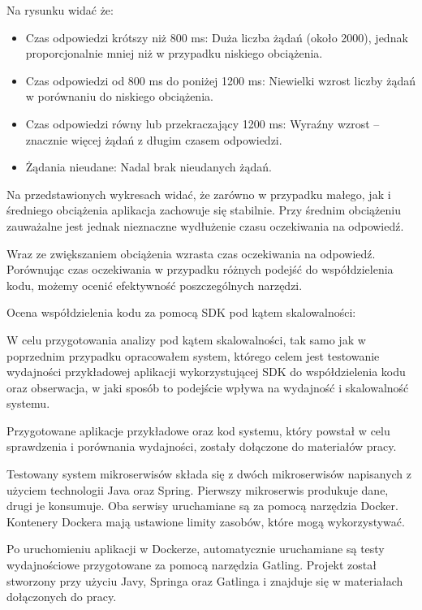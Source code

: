 \documentclass[runningheads,12pt]{llncs}
\begin{document}
Na rysunku widać że:

\begin{itemize}
    \item Czas odpowiedzi krótszy niż 800 ms: Duża liczba żądań (około 2000), jednak proporcjonalnie mniej niż w przypadku niskiego obciążenia.
    \item Czas odpowiedzi od 800 ms do poniżej 1200 ms: Niewielki wzrost liczby żądań w porównaniu do niskiego obciążenia.
    \item Czas odpowiedzi równy lub przekraczający 1200 ms: Wyraźny wzrost – znacznie więcej żądań z długim czasem odpowiedzi.
    \item Żądania nieudane: Nadal brak nieudanych żądań.
  \end{itemize}

Na przedstawionych wykresach widać, że zarówno w przypadku małego, jak i średniego obciążenia aplikacja zachowuje się stabilnie. Przy średnim obciążeniu zauważalne jest jednak nieznaczne wydłużenie czasu oczekiwania na odpowiedź.

\newpage

Wraz ze zwiększaniem obciążenia wzrasta czas oczekiwania na odpowiedź. Porównując czas oczekiwania w przypadku różnych podejść do współdzielenia kodu, możemy ocenić efektywność poszczególnych narzędzi.

Ocena współdzielenia kodu za pomocą SDK pod kątem skalowalności:

W celu przygotowania analizy pod kątem skalowalności, tak samo jak w poprzednim przypadku opracowałem system, którego celem jest testowanie wydajności przykładowej aplikacji wykorzystującej SDK do współdzielenia kodu oraz obserwacja, w jaki sposób to podejście wpływa na wydajność i skalowalność systemu.

Przygotowane aplikacje przykładowe oraz kod systemu, który powstał w celu sprawdzenia i porównania wydajności, zostały dołączone do materiałów pracy.

Testowany system mikroserwisów składa się z dwóch mikroserwisów napisanych z użyciem technologii Java oraz Spring. Pierwszy mikroserwis produkuje dane, drugi je konsumuje. Oba serwisy uruchamiane są za pomocą narzędzia Docker. Kontenery Dockera mają ustawione limity zasobów, które mogą wykorzystywać.

Po uruchomieniu aplikacji w Dockerze, automatycznie uruchamiane są testy wydajnościowe przygotowane za pomocą narzędzia Gatling. Projekt został stworzony przy użyciu Javy, Springa oraz Gatlinga i znajduje się w materiałach dołączonych do pracy.
\end{document}
